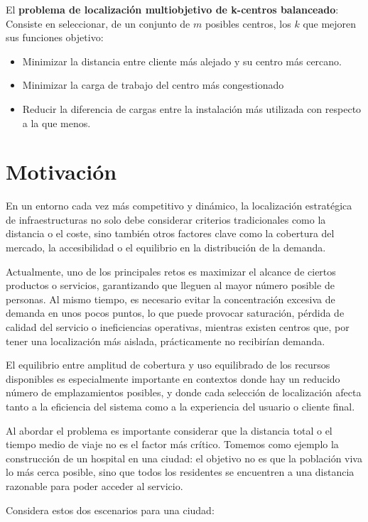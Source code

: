 \documentclass[12pt,a4paper]{book}
\begin{document}
El \textbf{problema de localización multiobjetivo de k-centros balanceado}: Consiste en seleccionar, de un conjunto de $m$ posibles centros, los $k$ que mejoren sus funciones objetivo:
\begin{itemize}
    \item Minimizar la distancia entre cliente más alejado y su centro más cercano.
    \item Minimizar la carga de trabajo del centro más congestionado
    \item Reducir la diferencia de cargas entre la instalación más utilizada con respecto a la que menos.
\end{itemize}

\section{Motivación}

En un entorno cada vez más competitivo y dinámico, la localización estratégica de infraestructuras no solo debe considerar criterios tradicionales como la distancia o el coste, sino también otros factores clave como la cobertura del mercado, la accesibilidad o el equilibrio en la distribución de la demanda.

Actualmente, uno de los principales retos es maximizar el alcance de ciertos productos o servicios, garantizando que lleguen al mayor número posible de personas. Al mismo tiempo, es necesario evitar la concentración excesiva de demanda en unos pocos puntos, lo que puede provocar saturación, pérdida de calidad del servicio o ineficiencias operativas, mientras existen centros que, por tener una localización más aislada, prácticamente no recibirían demanda.

El equilibrio entre amplitud de cobertura y uso equilibrado de los recursos disponibles es especialmente importante en contextos donde hay un reducido número de emplazamientos posibles, y donde cada selección de localización afecta tanto a la eficiencia del sistema como a la experiencia del usuario o cliente final.

Al abordar el problema es importante considerar que la distancia total o el tiempo medio de viaje no es el factor más crítico. 
Tomemos como ejemplo la construcción de un hospital en una ciudad: el objetivo no es que la población viva lo más cerca posible, sino que todos los residentes se encuentren a una distancia razonable para poder acceder al servicio.

Considera estos dos escenarios para una ciudad:
\end{document}
